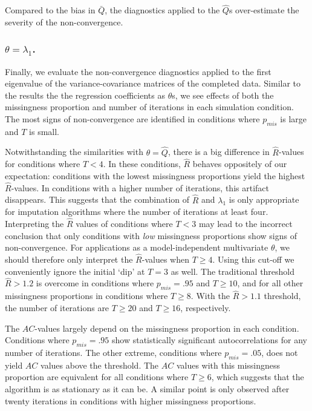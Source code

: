 \documentclass[Royal,times,sageh]{sagej}
\begin{document}
Compared to the bias in \(\bar{Q}\), the diagnostics applied to the \(\hat{Q}\)s over-estimate the severity of the non-convergence.

\hypertarget{thetalambda_1.}{%
\subsubsection{\texorpdfstring{\(\theta=\lambda_1\).}{\textbackslash theta=\textbackslash lambda\_1.}}\label{thetalambda_1.}}

Finally, we evaluate the non-convergence diagnostics applied to the first eigenvalue of the variance-covariance matrices of the completed data. Similar to the results the the regression coefficients as \(\theta\)s, we see effects of both the missingness proportion and number of iterations in each simulation condition. The most signs of non-convergence are identified in conditions where \(p_{mis}\) is large and \(T\) is small.

Notwithstanding the similarities with \(\theta=\hat{Q}\), there is a big difference in \(\widehat{R}\)-values for conditions where \(T<4\). In these conditions, \(\widehat{R}\) behaves oppositely of our expectation: conditions with the lowest missingness proportions yield the highest \(\widehat{R}\)-values. In conditions with a higher number of iterations, this artifact disappears. This suggests that the combination of \(\widehat{R}\) and \(\lambda_1\) is only appropriate for imputation algorithms where the number of iterations at least four. Interpreting the \(\widehat{R}\) values of conditions where \(T<3\) may lead to the incorrect conclusion that only conditions with \emph{low} missingness proportions show signs of non-convergence. For applications as a model-independent multivariate \(\theta\), we should therefore only interpret the \(\widehat{R}\)-values when \(T\geq4\). Using this cut-off we conveniently ignore the initial `dip' at \(T=3\) as well. The traditional threshold \(\widehat{R} > 1.2\) is overcome in conditions where \(p_{mis} = .95\) and \(T\geq10\), and for all other missingness proportions in conditions where \(T\geq8\). With the \(\widehat{R} > 1.1\) threshold, the number of iterations are \(T\geq20\) and \(T\geq16\), respectively.

The \(AC\)-values largely depend on the missingness proportion in each condition. Conditions where \(p_{mis}=.95\) show statistically significant autocorrelations for any number of iterations. The other extreme, conditions where \(p_{mis}=.05\), does not yield \(AC\) values above the threshold. The \(AC\) values with this missingness proportion are equivalent for all conditions where \(T\geq6\), which suggests that the algorithm is as stationary as it can be. A similar point is only observed after twenty iterations in conditions with higher missingness proportions.
\end{document}
